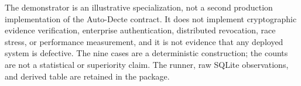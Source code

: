 \documentclass[preprint,12pt,authoryear]{elsarticle}
\begin{document}
The demonstrator is an illustrative specialization, not a second production
implementation of the Auto-Decte contract. It does not implement cryptographic
evidence verification, enterprise authentication, distributed revocation, race
stress, or performance measurement, and it is not evidence that any deployed
system is defective. The nine cases are a deterministic construction; the
counts are not a statistical or superiority claim. The runner, raw SQLite
observations, and derived table are retained in the package.
\end{document}

